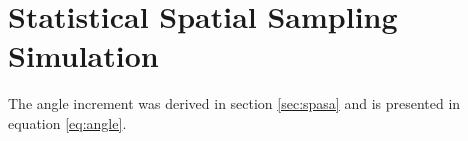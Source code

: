 \chapter{Statistical Spatial Sampling Simulation}

The angle increment was derived in section \ref{sec:spasa} and is presented in equation \ref{eq:angle}.
